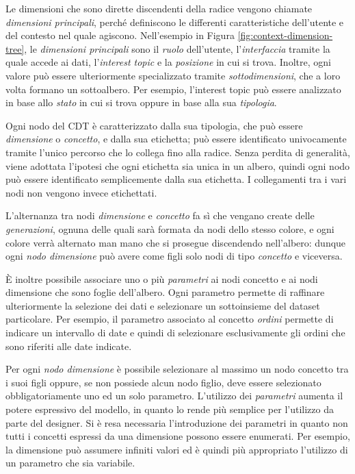 Le dimensioni che sono dirette discendenti della radice vengono chiamate \emph{dimensioni principali}, perché definiscono le differenti caratteristiche dell'utente e del contesto nel quale agiscono. Nell'esempio in Figura \ref{fig:context-dimension-tree}, le \emph{dimensioni principali} sono il \emph{ruolo} dell'utente, l'\emph{interfaccia} tramite la quale accede ai dati, l'\emph{interest topic} e la \emph{posizione} in cui si trova. Inoltre, ogni valore può essere ulteriormente specializzato tramite \emph{sottodimensioni}, che a loro volta formano un sottoalbero. Per esempio, l'interest topic  può essere analizzato in base allo \emph{stato} in cui si trova oppure in base alla sua \emph{tipologia}.

Ogni nodo del CDT è caratterizzato dalla sua tipologia, che può essere \emph{dimensione} o \emph{concetto}, e dalla sua etichetta; può essere identificato univocamente tramite l'unico percorso che lo collega fino alla radice. Senza perdita di generalità, viene adottata l'ipotesi che ogni etichetta sia unica in un albero, quindi ogni nodo può essere identificato semplicemente dalla sua etichetta. I collegamenti tra i vari nodi non vengono invece etichettati.

L'alternanza tra nodi \emph{dimensione} e \emph{concetto} fa sì che vengano create delle \emph{generazioni}, ognuna delle quali sarà formata da nodi dello stesso colore, e ogni colore verrà alternato man mano che si prosegue discendendo nell'albero: dunque ogni \emph{nodo dimensione} può avere come figli solo nodi di tipo \emph{concetto} e viceversa.

\`E inoltre possibile associare uno o più \emph{parametri} ai nodi concetto e ai nodi dimensione che sono foglie dell'albero. Ogni parametro permette di raffinare ulteriormente la selezione dei dati e selezionare un sottoinsieme del dataset particolare. Per esempio, il parametro  associato al concetto \emph{ordini} permette di indicare un intervallo di date e quindi di selezionare esclusivamente gli ordini che sono riferiti alle date indicate.

Per ogni \emph{nodo dimensione} è possibile selezionare al massimo un nodo concetto tra i suoi figli oppure, se non possiede alcun nodo figlio, deve essere selezionato obbligatoriamente uno ed un solo parametro. L'utilizzo dei \emph{parametri} aumenta il potere espressivo del modello, in quanto lo rende più semplice per l'utilizzo da parte del designer. Si è resa necessaria l'introduzione dei parametri in quanto non tutti i concetti espressi da una dimensione possono essere enumerati. Per esempio, la dimensione  può assumere infiniti valori ed è quindi più appropriato l'utilizzo di un parametro che sia variabile.


